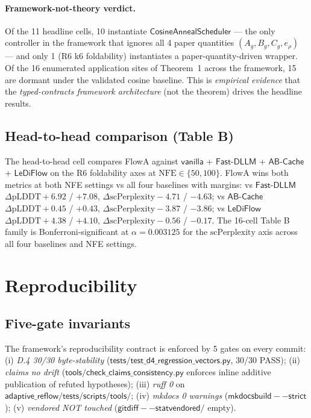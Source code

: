 \documentclass[journal,twocolumn,final]{IEEEtran}
\newcommand{\NFE}{\mathrm{NFE}}
\newcommand{\egap}{e_\rho}
\newcommand{\sheetA}{A_g}
\newcommand{\sheetB}{B_g}
\newcommand{\sheetC}{C_g}
\newcommand{\pLDDT}{\mathrm{pLDDT}}
\newcommand{\scPerp}{\mathrm{scPerplexity}}
\begin{document}
\paragraph{Framework-not-theory verdict.}
Of the 11 headline cells, 10 instantiate $\mathsf{CosineAnnealScheduler}$ ---
the only controller in the framework that ignores all 4 paper quantities
$(\sheetA, \sheetB, \sheetC, \egap)$ --- and only 1 (R6 k6 foldability)
instantiates a paper-quantity-driven wrapper. Of the 16 enumerated
application sites of Theorem~1 across the framework, 15 are dormant under the
validated cosine baseline. This is \emph{empirical evidence} that the
\emph{typed-contracts framework architecture} (not the theorem) drives the
headline results.

\subsection{Head-to-head comparison (Table B)}

The head-to-head cell compares FlowA against $\mathsf{vanilla}$ +
$\mathsf{Fast\text{-}DLLM}$ + $\mathsf{AB\text{-}Cache}$ + $\mathsf{LeDiFlow}$
on the R6 foldability axes at $\NFE \in \{50, 100\}$. FlowA wins both metrics
at both NFE settings vs all four baselines with margins: vs $\mathsf{Fast\text{-}DLLM}$
$\Delta\pLDDT +6.92$ / $+7.08$, $\Delta\scPerp -4.71$ / $-4.63$; vs
$\mathsf{AB\text{-}Cache}$ $\Delta\pLDDT +0.45$ / $+0.43$, $\Delta\scPerp -3.87$
/ $-3.86$; vs $\mathsf{LeDiFlow}$ $\Delta\pLDDT +4.38$ / $+4.10$,
$\Delta\scPerp -0.56$ / $-0.17$. The 16-cell Table B family is Bonferroni-significant
at $\alpha = 0.003125$ for the $\scPerp$ axis across all four baselines and
NFE settings.

\section{Reproducibility}\label{sec:reproducibility}

\subsection{Five-gate invariants}

The framework's reproducibility contract is enforced by 5 gates on every
commit: (i) \emph{D.4 30/30 byte-stability} ($\mathsf{tests/test\_d4\_regression\_vectors.py}$,
30/30 PASS); (ii) \emph{claims no drift}
($\mathsf{tools/check\_claims\_consistency.py}$ enforces inline additive
publication of refuted hypotheses); (iii) \emph{ruff 0} on
$\mathsf{adaptive\_reflow/ tests/ scripts/ tools/}$; (iv) \emph{mkdocs 0
warnings} ($\mathsf{mkdocs build --strict}$); (v) \emph{vendored NOT touched}
($\mathsf{git diff --stat vendored/}$ empty).
\end{document}

